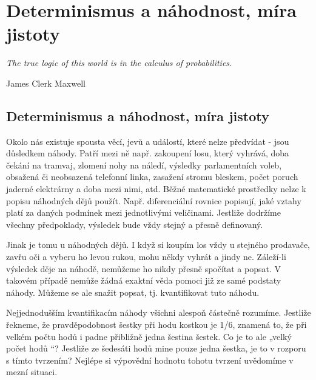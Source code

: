 \graphicspath{{../src/MAI/img/}}
\setchaptertoc
\chapter{Determinismus a náhodnost, míra jistoty}\label{mai:IchapIVa}
  \epigraph{\emph{The true logic of this world is in the calculus of probabilities.}}{James Clerk 
    Maxwell}
  \section{Determinismus a náhodnost, míra jistoty}
    Okolo nás existuje spousta věcí, jevů a událostí, které nelze předvídat - jsou důsledkem náhody.
    Patří mezi ně např. zakoupení losu, který vyhrává, doba čekání na tramvaj, zlomení nohy na
    náledí, výsledky parlamentních voleb, obsažená či neobsazená telefonní linka, zasažení stromu
    bleskem, počet poruch jaderné elektrárny a doba mezi nimi, atd. Běžné matematické prostředky
    nelze k popisu náhodných dějů použít. Např. diferenciální rovnice popisují, jaké vztahy platí za
    daných podmínek mezi jednotlivými veličinami. Jestliže dodržíme všechny předpoklady, výsledek
    bude vždy stejný a přesně definovaný.
    
    Jinak je tomu u náhodných dějů. I když si koupím los vždy u stejného prodavače, zavřu oči a
    vyberu ho levou rukou, mohu někdy vyhrát a jindy ne. Záleží-li výsledek děje na náhodě, nemůžeme
    ho nikdy přesně spočítat a popsat. V takovém případě nemůže žádná exaktní věda pomoci již ze
    samé podstaty náhody. Můžeme se ale snažit popsat, tj. kvantiﬁkovat tuto náhodu.
    
    Nejjednodušším kvantiﬁkacím náhody všichni alespoň částečně rozumíme. Jestliže řekneme, že
    pravděpodobnost šestky při hodu kostkou je \num{1/6}, znamená to, že při velkém počtu hodů i
    padne přibližně jedna šestina šestek. Co je to ale „velký počet hodů “? Jestliže ze šedesáti
    hodů mine pouze jedna šestka, je to v rozporu s tímto tvrzením? Nejlépe si výpovědní hodnotu
    tohotu tvrzení uvědomíme v mezní situaci.

    

